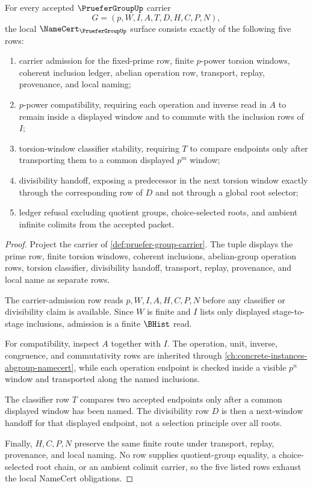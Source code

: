 \begin{theorem}
\label{thm:pruefer-group-namecert-obligations}
For every accepted $\PrueferGroupUp$ carrier
$$
G=(p,W,I,A,T,D,H,C,P,N),
$$
the local $\NameCert_{\PrueferGroupUp}$ surface consists exactly of the following five rows:
\begin{enumerate}
\item carrier admission for the fixed-prime row, finite $p$-power torsion windows, coherent inclusion ledger, abelian operation row, transport, replay, provenance, and local naming;
\item $p$-power compatibility, requiring each operation and inverse read in $A$ to remain inside a displayed window and to commute with the inclusion rows of $I$;
\item torsion-window classifier stability, requiring $T$ to compare endpoints only after transporting them to a common displayed $p^m$ window;
\item divisibility handoff, exposing a predecessor in the next torsion window exactly through the corresponding row of $D$ and not through a global root selector;
\item ledger refusal excluding quotient groups, choice-selected roots, and ambient infinite colimits from the accepted packet.
\end{enumerate}
\end{theorem}
\begin{proof}
Project the carrier of \autoref{def:pruefer-group-carrier}. The tuple displays the prime row, finite torsion windows, coherent inclusions, abelian-group operation rows, torsion classifier, divisibility handoff, transport, replay, provenance, and local name as separate rows.

The carrier-admission row reads $p,W,I,A,H,C,P,N$ before any classifier or divisibility claim is available. Since $W$ is finite and $I$ lists only displayed stage-to-stage inclusions, admission is a finite $\BHist$ read.

For compatibility, inspect $A$ together with $I$. The operation, unit, inverse, congruence, and commutativity rows are inherited through \autoref{ch:concrete-instances-abgroup-namecert}, while each operation endpoint is checked inside a visible $p^n$ window and transported along the named inclusions.

The classifier row $T$ compares two accepted endpoints only after a common displayed window has been named. The divisibility row $D$ is then a next-window handoff for that displayed endpoint, not a selection principle over all roots.

Finally, $H,C,P,N$ preserve the same finite route under transport, replay, provenance, and local naming. No row supplies quotient-group equality, a choice-selected root chain, or an ambient colimit carrier, so the five listed rows exhaust the local NameCert obligations.
\end{proof}


